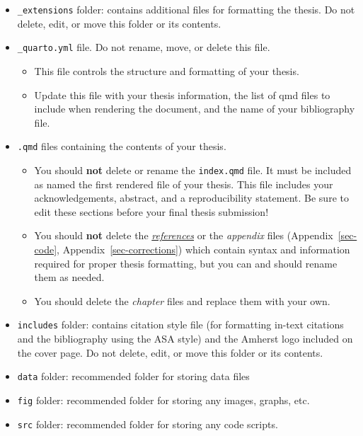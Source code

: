 \documentclass[
  11pt,
  letterpaper,
  twoside]{report}
\providecommand{\tightlist}{%
  \setlength{\itemsep}{0pt}\setlength{\parskip}{0pt}}\usepackage{longtable,booktabs,array}
\begin{document}
\begin{itemize}
\item
  \texttt{\_extensions} folder: contains additional files for formatting
  the thesis. Do not delete, edit, or move this folder or its contents.
\item
  \texttt{\_quarto.yml} file. Do not rename, move, or delete this file.

  \begin{itemize}
  \tightlist
  \item
    This file controls the structure and formatting of your thesis.
  \item
    Update this file with your thesis information, the list of qmd files
    to include when rendering the document, and the name of your
    bibliography file.
  \end{itemize}
\item
  \texttt{.qmd} files containing the contents of your thesis.

  \begin{itemize}
  \tightlist
  \item
    You should \textbf{not} delete or rename the \texttt{index.qmd}
    file. It must be included as named the first rendered file of your
    thesis. This file includes your acknowledgements, abstract, and a
    reproducibility statement. Be sure to edit these sections before
    your final thesis submission!
  \item
    You should \textbf{not} delete the
    \hyperref[references]{\emph{references}} or the \emph{appendix}
    files (Appendix~\ref{sec-code}, Appendix~\ref{sec-corrections})
    which contain syntax and information required for proper thesis
    formatting, but you can and should rename them as needed.
  \item
    You should delete the \emph{chapter} files and replace them with
    your own.
  \end{itemize}
\item
  \texttt{includes} folder: contains citation style file (for formatting
  in-text citations and the bibliography using the ASA style) and the
  Amherst logo included on the cover page. Do not delete, edit, or move
  this folder or its contents.
\item
  \texttt{data} folder: recommended folder for storing data files
\item
  \texttt{fig} folder: recommended folder for storing any images,
  graphs, etc.
\item
  \texttt{src} folder: recommended folder for storing any code scripts.
\end{itemize}
\end{document}
